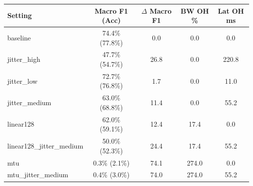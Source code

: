 \begin{tabular}{lcccc}
\toprule
Setting & Macro F1 (Acc) & $\Delta$ Macro F1 & BW OH \% & Lat OH ms \\
\midrule
baseline & 74.4\% (77.8\%) & 0.0 & 0.0 & 0.0 \\
jitter_high & 47.7\% (54.7\%) & 26.8 & 0.0 & 220.8 \\
jitter_low & 72.7\% (76.8\%) & 1.7 & 0.0 & 11.0 \\
jitter_medium & 63.0\% (68.8\%) & 11.4 & 0.0 & 55.2 \\
linear128 & 62.0\% (59.1\%) & 12.4 & 17.4 & 0.0 \\
linear128_jitter_medium & 50.0\% (52.3\%) & 24.4 & 17.4 & 55.2 \\
mtu & 0.3\% (2.1\%) & 74.1 & 274.0 & 0.0 \\
mtu_jitter_medium & 0.4\% (3.0\%) & 74.0 & 274.0 & 55.2 \\
\bottomrule
\end{tabular}
